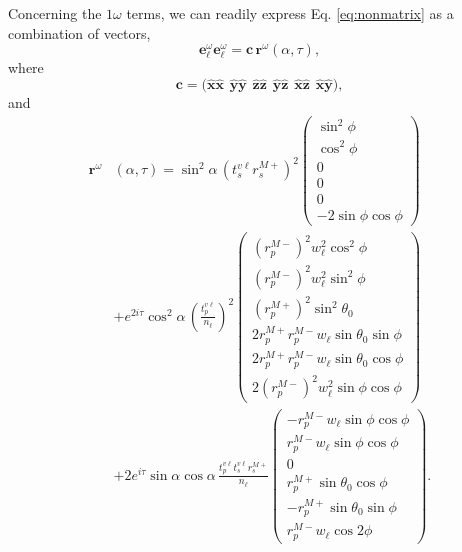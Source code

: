 \documentclass[aps,pra,10pt,amsmath,twocolumn,letterpaper]{revtex4-1}
\begin{document}
Concerning the $1\omega$ terms, we can readily express Eq. \eqref{eq:nonmatrix}
as a combination of vectors,
\begin{equation*}\label{eq:ewsquared}
\mathbf{e}^{\omega}_{\ell}
\mathbf{e}^{\omega}_{\ell}
=
\mathbf{c}\,\mathbf{r}^{\omega}(\alpha,\tau),
\end{equation*}
where
\begin{equation*}
\mathbf{c} = 
\big(
\hat{\mathbf{x}}\hat{\mathbf{x}}\hspace{5pt}
\hat{\mathbf{y}}\hat{\mathbf{y}}\hspace{5pt}
\hat{\mathbf{z}}\hat{\mathbf{z}}\hspace{5pt}
\hat{\mathbf{y}}\hat{\mathbf{z}}\hspace{5pt}
\hat{\mathbf{x}}\hat{\mathbf{z}}\hspace{5pt}
\hat{\mathbf{x}}\hat{\mathbf{y}}
\big),
\end{equation*}
and
\begin{equation}\label{eq:r1wmatrix}
\begin{split}
\mathbf{r}^{\omega}&(\alpha,\tau)
=
\sin^{2}\alpha\,
\left(t^{v\ell}_{s}r^{M+}_{s}\right)^{2}
\begin{pmatrix}
\sin^{2}\phi        \\[8pt]
\cos^{2}\phi        \\[8pt]
0                   \\[8pt]
0                   \\[8pt]
0                   \\[8pt]
- 2\sin\phi\cos\phi
\end{pmatrix}\\[10pt]
&+
e^{2i\tau}\cos^{2}\alpha\,
\left(\frac{t^{v\ell}_{p}}{n_{\ell}}\right)^{2}
\begin{pmatrix}
\left(r^{M-}_{p}\right)^{2}w^{2}_{\ell}\cos^{2}\phi       \\[8pt]    
\left(r^{M-}_{p}\right)^{2}w^{2}_{\ell}\sin^{2}\phi       \\[8pt]
\left(r^{M+}_{p}\right)^{2}\sin^{2}\theta_{0}             \\[8pt]
2r^{M+}_{p}r^{M-}_{p}w_{\ell}\sin\theta_{0}\sin\phi       \\[8pt]
2r^{M+}_{p}r^{M-}_{p}w_{\ell}\sin\theta_{0}\cos\phi       \\[8pt]
2\left(r^{M-}_{p}\right)^{2}w^{2}_{\ell}\sin\phi\cos\phi  
\end{pmatrix}\\[10pt]
&+
2e^{i\tau}\sin\alpha\cos\alpha\,
\frac{t^{v\ell}_{p}t^{v\ell}_{s}r^{M+}_{s}}{n_{\ell}}
\begin{pmatrix}
-r^{M-}_{p}w_{\ell}\sin\phi\cos\phi \\[8pt]
r^{M-}_{p}w_{\ell}\sin\phi\cos\phi  \\[8pt]
0                                   \\[8pt]
r^{M+}_{p}\sin\theta_{0}\cos\phi    \\[8pt]
-r^{M+}_{p}\sin\theta_{0}\sin\phi   \\[8pt]
r^{M-}_{p}w_{\ell}\cos 2\phi        
\end{pmatrix}.
\end{split}
\end{equation}
\end{document}
